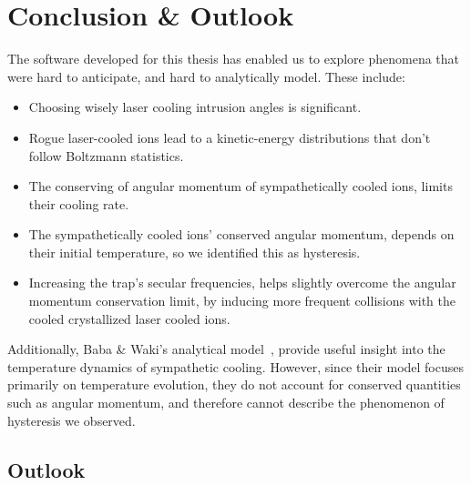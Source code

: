 \chapter{Conclusion \& Outlook}

The software developed for this thesis has enabled us to explore phenomena that were hard to anticipate, and hard to analytically model. These include:

\begin{itemize}
	\item Choosing wisely laser cooling intrusion angles is significant.
	\item Rogue laser-cooled ions lead to a kinetic-energy distributions that don't follow Boltzmann statistics.
	\item The conserving of angular momentum of sympathetically cooled ions, limits their cooling rate.
	\item The sympathetically cooled ions' conserved angular momentum, depends on their initial temperature, so we identified this as hysteresis.
	\item Increasing the trap's secular frequencies, helps slightly overcome the angular momentum conservation limit, by inducing more frequent collisions with the cooled crystallized laser cooled ions.
\end{itemize}

Additionally, Baba \& Waki's analytical model~\cite{BabaWakiSympatheticCooling}, provide useful insight into the temperature dynamics of sympathetic cooling. However, since their model focuses primarily on temperature evolution, they do not account for conserved quantities such as angular momentum, and therefore cannot describe the phenomenon of hysteresis we observed.

\section*{Outlook}

